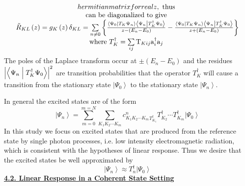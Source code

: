 \documentclass{amsart}
\begin{document}
\[\begin{array}{c}
{hermitian matrix for real }z,\mbox{ thus } \\
 \mbox{can be diagonalized to give } \\
 \tilde {R}_{KL} \left( z \right)=g_K \left( z \right)\delta _{KL}
=\sum\limits_{n\ne 0} {\left\{ {\frac{\left\langle {\Psi _0 }
\mathrel{\left| {\vphantom {{\Psi _0 } {T_K \Psi _n }}} \right.
\kern-\nulldelimiterspace} {T_K \Psi _n } \right\rangle \left\langle {\Psi
_n } \mathrel{\left| {\vphantom {{\Psi _n } {T_K^\dag \Psi _0 }}} \right.
\kern-\nulldelimiterspace} {T_K^\dag \Psi _0 } \right\rangle }{z-\left( {E_n
-E_0 } \right)}-\frac{\left\langle {\Psi _0 } \mathrel{\left| {\vphantom
{{\Psi _0 } {T_K \Psi _n }}} \right. \kern-\nulldelimiterspace} {T_K \Psi _n
} \right\rangle \left\langle {\Psi _n } \mathrel{\left| {\vphantom {{\Psi _n
} {T_K^\dag \Psi _0 }}} \right. \kern-\nulldelimiterspace} {T_K^\dag \Psi _0
} \right\rangle }{z+\left( {E_n -E_0 } \right)}} \right\}} \\
 \mbox{where }T_K^\dag =\sum\limits_{ij} {\mbox{T}_{Kij} \mbox{a}_i^\dag
\mbox{a}_j } \mbox{ } \\
 \end{array}
\]
The poles of the Laplace transform occur at $\pm \left( {E_n -E_0 } \right)$
and the residues $\left| {\left\langle {\Psi _n } \mathrel{\left| {\vphantom
{{\Psi _n } {T_K^\dag \Psi _0 }}} \right. \kern-\nulldelimiterspace}
{T_K^\dag \Psi _0 } \right\rangle } \right|^2$ are transition probabilities
that the operator $T_K^\dag $ will cause a transition from the stationary
state $\left| {\Psi _0 } \right\rangle $ to the stationary state $\left|
{\Psi _n } \right\rangle $.

In general the excited states are of the form
\[
\left| {\Psi _n } \right\rangle =\sum\limits_{m=0}^{m=N} {\sum\limits_{K_1
K_2 \cdots K_m } {c_{K_1 K_2 \cdots K_m }^n _ T_{K_1 }^\dag T_{K_2 }^\dag
\cdots T_{K_m }^\dag } } \left| {\Psi _0 } \right\rangle
\]
In this study we focus on excited states that are produced from the
reference state by single photon processes, i.e. low intensity
electromagnetic radiation, which is consistent with the hypotheses of linear
response. Thus we desire that the excited states be well approximated by
\[
\left| {\Psi _n } \right\rangle \approx T_n^\dag \left| {\Psi _0 }
\right\rangle
\]
\underline {\textbf{4.2. Linear Response in a Coherent State Setting}}
\end{document}
